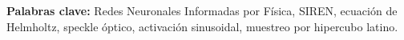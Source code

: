 \documentclass[12pt]{article}
\begin{document}
\vspace{0.5em}
\noindent \textbf{Palabras clave:} Redes Neuronales Informadas por Física,
SIREN, ecuación de Helmholtz, speckle óptico, activación sinusoidal,
muestreo por hipercubo latino.

\newpage
\setcounter{page}{1}








\clearpage
{\small \printbibliography}
\end{document}
